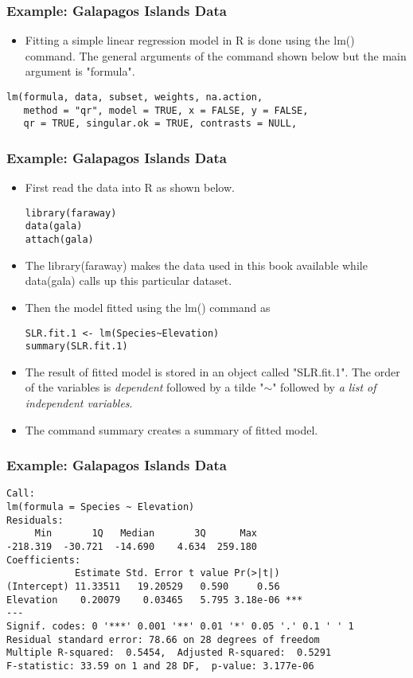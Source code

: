 \documentclass{beamer}
\begin{document}
\begin{frame}[fragile]\frametitle{Example: Galapagos Islands Data}
\begin{itemize}
\item Fitting a simple linear regression model in R is done using the {\color{red} lm()} command. The general arguments of the command shown below but the main argument is "formula".
\end{itemize}
\begin{verbatim}
lm(formula, data, subset, weights, na.action,
   method = "qr", model = TRUE, x = FALSE, y = FALSE,
   qr = TRUE, singular.ok = TRUE, contrasts = NULL,
\end{verbatim}
\end{frame}

\begin{frame}[fragile]\frametitle{Example: Galapagos Islands Data}
\begin{itemize}
\item First read the data into R as shown below.
\begin{verbatim}
library(faraway)
data(gala)
attach(gala)
\end{verbatim}
\item The {\color{blue} library(faraway)} makes the data used in this book available while {\color{blue} data(gala)} calls up this particular dataset.
\item Then the model fitted using the {\color{red} lm()} command as
\begin{verbatim}
SLR.fit.1 <- lm(Species~Elevation)
summary(SLR.fit.1)
\end{verbatim}
\item The result of fitted model is stored in an object called "SLR.fit.1". The order of the variables is \emph{dependent} followed by a tilde "$\sim$" followed by \emph{a list of independent variables}.
\item The command {\color{blue} summary} creates a summary of fitted model.
\end{itemize}
\end{frame}

\begin{frame}[fragile]\frametitle{Example: Galapagos Islands Data}
\begin{verbatim}
Call:
lm(formula = Species ~ Elevation)
Residuals:
     Min       1Q   Median       3Q      Max
-218.319  -30.721  -14.690    4.634  259.180
Coefficients:
            Estimate Std. Error t value Pr(>|t|)
(Intercept) 11.33511   19.20529   0.590     0.56
Elevation    0.20079    0.03465   5.795 3.18e-06 ***
---
Signif. codes: 0 '***' 0.001 '**' 0.01 '*' 0.05 '.' 0.1 ' ' 1
Residual standard error: 78.66 on 28 degrees of freedom
Multiple R-squared:  0.5454,  Adjusted R-squared:  0.5291
F-statistic: 33.59 on 1 and 28 DF,  p-value: 3.177e-06
\end{verbatim}
\end{frame}
\end{document}
